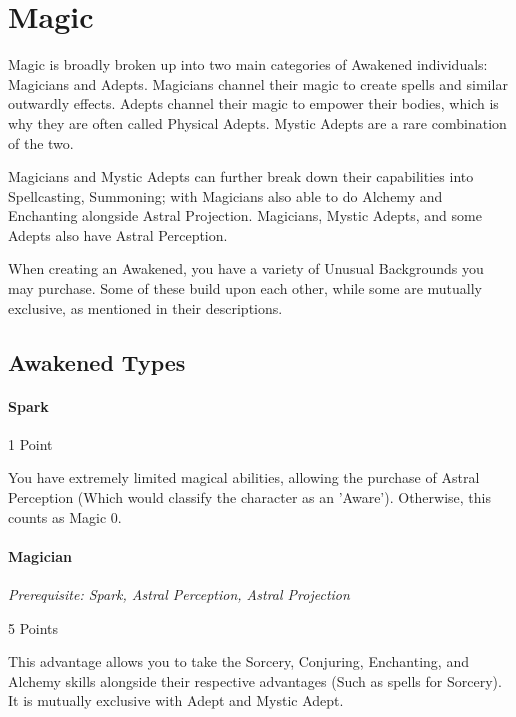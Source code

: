 \section{Magic}

\begin{multicols*}{3}
	
	Magic is broadly broken up into two main categories of Awakened individuals: Magicians and Adepts. Magicians channel their magic to create spells and similar outwardly effects. Adepts channel their magic to empower their bodies, which is why they are often called Physical Adepts. Mystic Adepts are a rare combination of the two.
	
	Magicians and Mystic Adepts can further break down their capabilities into Spellcasting, Summoning; with Magicians also able to do Alchemy and Enchanting alongside Astral Projection. Magicians, Mystic Adepts, and some Adepts also have Astral Perception.
	
	When creating an Awakened, you have a variety of Unusual Backgrounds you may purchase. Some of these build upon each other, while some are mutually exclusive, as mentioned in their descriptions. 
	
	\subsection{Awakened Types}
	
	\paragraph{Spark}\label{spark}
	\begin{flushright}
		1 Point
	\end{flushright}
	
	You have extremely limited magical abilities, allowing the purchase of Astral Perception (Which would classify the character as an 'Aware'). Otherwise, this counts as Magic 0.
	
	\paragraph{Magician}
	\textit{Prerequisite: Spark, Astral Perception, Astral Projection}
	\begin{flushright}
		5 Points
	\end{flushright}
	
	This advantage allows you to take the Sorcery, Conjuring, Enchanting, and Alchemy skills alongside their respective advantages (Such as spells for Sorcery). It is mutually exclusive with Adept and Mystic Adept.
	

\end{multicols*}
